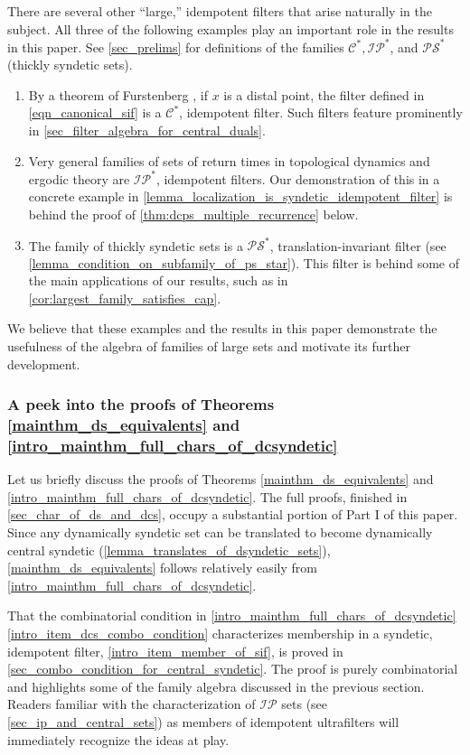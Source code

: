 \documentclass[letter,11pt]{article}
\theoremstyle{plain}
\theoremstyle{definition}
\theoremstyle{plain}
\theoremstyle{plain}
\numberwithin{equation}{section}
\newcommand{\PS}{\mathcal{PS}}
\newcommand{\central}{\mathcal{C}}
\newcommand{\IP}{\mathcal{IP}}
\begin{document}
There are several other ``large,'' idempotent filters that arise naturally in the subject.  All three of the following examples play an important role in the results in this paper. See \cref{sec_prelims} for definitions of the families $\central^*, \IP^*$, and $\PS^*$ (thickly syndetic sets).
\begin{enumerate}
    \item By a theorem of Furstenberg \cite[Thm. 9.11]{furstenberg_book_1981}, if $x$ is a distal point, the filter defined in \eqref{eqn_canonical_sif} is a $\central^*$, idempotent filter.  Such filters feature prominently in \cref{sec_filter_algebra_for_central_duals}.

    \item Very general families of sets of return times in topological dynamics and ergodic theory are $\IP^*$, idempotent filters. Our demonstration of this in a concrete example in \cref{lemma_localization_is_syndetic_idempotent_filter} is behind the proof of \cref{thm:dcps_multiple_recurrence} below. 

    \item The family of thickly syndetic sets is a $\PS^*$, translation-invariant filter (see \cref{lemma_condition_on_subfamily_of_ps_star}).  This filter is behind some of the main applications of our results, such as in \cref{cor:largest_family_satisfies_cap}.
\end{enumerate}
We believe that these examples and the results in this paper demonstrate the usefulness of the algebra of families of large sets and motivate its further development.



\subsubsection{A peek into the proofs of Theorems \ref{mainthm_ds_equivalents} and \ref{intro_mainthm_full_chars_of_dcsyndetic}}
\label{sec_intro_into_the_proof}

Let us briefly discuss the proofs of Theorems \ref{mainthm_ds_equivalents} and \ref{intro_mainthm_full_chars_of_dcsyndetic}.  The full proofs, finished in \cref{sec_char_of_ds_and_dcs}, occupy a substantial portion of Part I of this paper. Since any dynamically syndetic set can be translated to become dynamically central syndetic (\cref{lemma_translates_of_dsyndetic_sets}), \cref{mainthm_ds_equivalents} follows relatively easily from \cref{intro_mainthm_full_chars_of_dcsyndetic}.

That the combinatorial condition in \cref{intro_mainthm_full_chars_of_dcsyndetic} \eqref{intro_item_dcs_combo_condition} characterizes membership in a syndetic, idempotent filter, \eqref{intro_item_member_of_sif}, is proved in \cref{sec_combo_condition_for_central_syndetic}.  The proof is purely combinatorial and highlights some of the family algebra discussed in the previous section.  Readers familiar with the characterization of $\IP$ sets (see \cref{sec_ip_and_central_sets}) as members of idempotent ultrafilters will immediately recognize the ideas at play.
\end{document}
